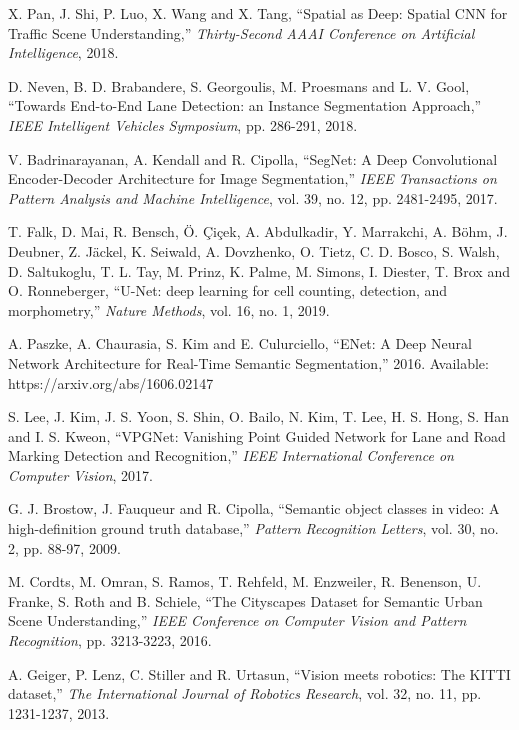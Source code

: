 \documentclass[fleqn,10pt,twocolumn]{ICCAS2019}
\begin{document}
\begin{thebibliography}{99}
X. Pan, J. Shi, P. Luo, X. Wang and X. Tang, ``Spatial as Deep: Spatial CNN for Traffic Scene Understanding,'' {\it Thirty-Second AAAI Conference on Artificial Intelligence}, 2018.

D. Neven, B. D. Brabandere, S. Georgoulis, M. Proesmans and L. V. Gool, ``Towards End-to-End Lane Detection: an Instance Segmentation Approach,'' {\it IEEE Intelligent Vehicles Symposium}, pp. 286-291, 2018.

V. Badrinarayanan, A. Kendall and R. Cipolla, ``SegNet: A Deep Convolutional Encoder-Decoder Architecture for Image Segmentation,'' {\it IEEE Transactions on Pattern Analysis and Machine Intelligence}, vol. 39, no. 12, pp. 2481-2495, 2017.

T. Falk, D. Mai, R. Bensch, \"{O}. \c{C}i\c{c}ek, A. Abdulkadir, Y. Marrakchi, A. B\"{o}hm, J. Deubner, Z. Jäckel, K. Seiwald, A. Dovzhenko, O. Tietz, C. D. Bosco, S. Walsh, D. Saltukoglu, T. L. Tay, M. Prinz, K. Palme, M. Simons, I. Diester, T. Brox and O. Ronneberger, ``U-Net: deep learning for cell counting, detection, and morphometry,'' {\it Nature Methods}, vol. 16, no. 1, 2019.

A. Paszke, A. Chaurasia, S. Kim and E. Culurciello, ``ENet: A Deep Neural Network Architecture for Real-Time Semantic Segmentation,'' 2016. Available: https://arxiv.org/abs/1606.02147

S. Lee, J. Kim, J. S. Yoon, S. Shin, O. Bailo, N. Kim, T. Lee, H. S. Hong, S. Han and I. S. Kweon, ``VPGNet: Vanishing Point Guided Network for Lane and Road Marking Detection and Recognition,'' {\it IEEE International Conference on Computer Vision}, 2017.

G. J. Brostow, J. Fauqueur and R. Cipolla, ``Semantic object classes in video: A high-definition ground truth database,'' {\it Pattern Recognition Letters}, vol. 30, no. 2, pp. 88-97, 2009.

M. Cordts, M. Omran, S. Ramos, T. Rehfeld, M. Enzweiler, R. Benenson, U. Franke, S. Roth and B. Schiele, ``The Cityscapes Dataset for Semantic Urban Scene Understanding,'' {\it IEEE Conference on Computer Vision and Pattern Recognition}, pp. 3213-3223, 2016.

A. Geiger, P. Lenz, C. Stiller and R. Urtasun, ``Vision meets robotics: The KITTI dataset,'' {\it The International Journal of Robotics Research}, vol. 32, no. 11, pp. 1231-1237, 2013.


\end{thebibliography}
\end{document}
